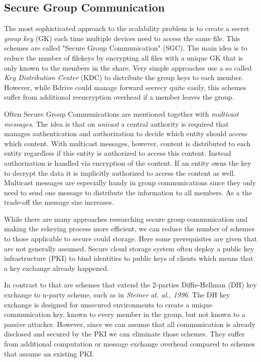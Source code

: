 \subsection{Secure Group Communication}
The most sophisticated approach to the scalability problem is to create a secret \textit{group key} (\ac{GK}) each time multiple devices need to access the same file. This schemes are called "Secure Group Communication" (\ac{SGC}). The main idea is to reduce the number of filekeys by encrypting all files with a unique \ac{GK} that is only known to the members in the share. Very simple approaches use a so called \textit{Key Distribution Center} (\ac{KDC}) to distribute the group keys to each member. However, while Bdrive could manage forward secrecy quite easily, this schemes suffer from additional reencryption overhead if a member leaves the group. 

Often Secure Group Communications are mentioned together with \textit{multicast messages}. The idea is that on \textit{unicast} a central authority is required that manages authentication and authorization to decide which entity should access which content. With multicast messages, however, content is distributed to each entity regardless if this entity is authorized to access this content. Instead authorization is handled via encryption of the content. If an entity owns the key to decrypt the data it is implicitly authorized to access the content as well. Multicast messages are especially handy in group communications since they only need to send one message to distribute the information to all members. As a the trade-off the message size increases.

While there are many approaches researching secure group communication and making the rekeying process more efficient, we can reduce the number of schemes to those applicable to secure could storage. Here some prerequisites are given that are not generally assumed. Secure cloud storage system often deploy a public key infrastructure (\ac{PKI}) to bind identities to public keys of clients which means that a key exchange already happened.

In contrast to that are schemes that extend the 2-parties Diffie-Hellman (\ac{DH}) key exchange to n-party scheme, such as in \textit{Steiner at. al., 1996}\cite{steiner1996diffie}. The \ac{DH} key exchange is designed for unsecured environments to create a unique communication key, known to every member in the group, but not known to a passive attacker. However, since we can assume that all communication is already disclosed and secured by the \ac{PKI} we can eliminate those schemes. They suffer from additional computation or message exchange overhead compared to schemes that assume an existing \ac{PKI}.   

